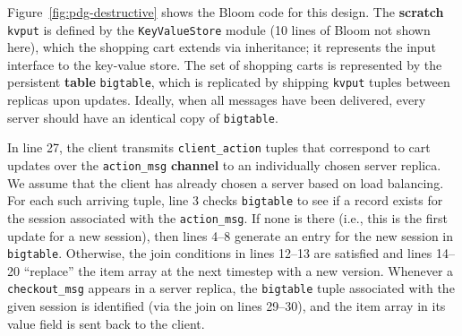 Figure~\ref{fig:pdg-destructive} shows the Bloom code for this design.  The
\textbf{scratch} \texttt{kvput} is defined by the \texttt{KeyValueStore} module (10
lines of Bloom not shown here), which the shopping cart extends via
inheritance; it represents the input interface to the key-value store.
The set of shopping carts is represented by the persistent \textbf{table} \texttt{bigtable}, which is replicated
by shipping \texttt{kvput} tuples between replicas upon updates. 
Ideally, when all messages have been delivered, every server should have an 
identical copy of \texttt{bigtable}.

In line 27, the client transmits \texttt{client\_action} tuples that correspond to cart
updates over the \texttt{action\_msg} \textbf{channel} to an individually
chosen server replica.  We assume that the client has already chosen a server
based on load balancing.
For each such arriving
tuple, line 3
checks \texttt{bigtable} to see if a record exists for the
session associated with the \texttt{action\_msg}.  If none is there (i.e., this
is the first update for a new session), then lines 4--8 generate an entry for
the new session in \texttt{bigtable}.  Otherwise, the join conditions in lines 12--13 are
satisfied and lines 14--20 ``replace'' the item array
at the next timestep with a new version.  
Whenever a \texttt{checkout\_msg} appears in a server replica, the 
\texttt{bigtable} tuple associated with the given session is identified (via the join
on lines 29--30), and the item array in its value field is sent back to the client.  


